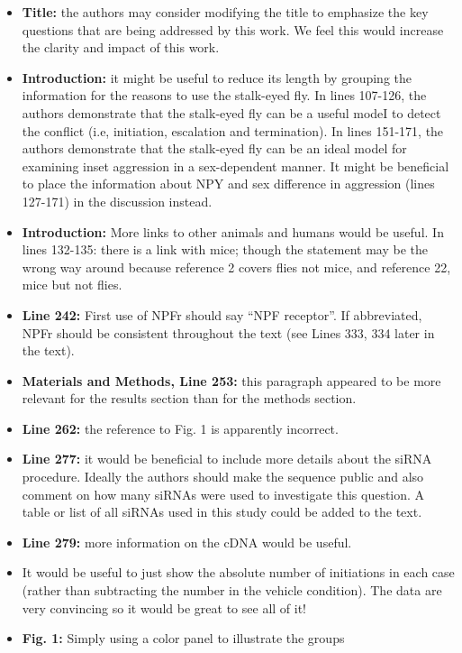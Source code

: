 \documentclass[10pt]{article}
\providecommand{\tightlist}{\setlength{\itemsep}{0pt}\setlength{\parskip}{0pt}}%
\begin{document}
\begin{itemize}
\tightlist
\item
  \textbf{Title:} the authors may consider modifying the title to
  emphasize the key questions that are being addressed by this work. We
  feel this would increase the clarity and impact of this work.
\item
  \textbf{Introduction:} it might be useful to reduce its length by
  grouping the information for the reasons to use the stalk-eyed fly. In
  lines 107-126, the authors demonstrate that the stalk-eyed fly can be
  a useful modeI to detect the conflict (i.e, initiation, escalation and
  termination). In lines 151-171, the authors demonstrate that the
  stalk-eyed fly can be an ideal model for examining inset aggression in
  a sex-dependent manner. It might be beneficial to place the
  information about NPY and sex difference in aggression (lines 127-171)
  in the discussion instead.~
\item
  \textbf{Introduction:} More links to other animals and humans would be
  useful. In lines 132-135: there is a link with mice; though the
  statement may be the wrong way around because reference 2 covers flies
  not mice, and reference 22, mice but not flies.
\item
  \textbf{Line 242:} First use of NPFr should say ``NPF receptor''. If
  abbreviated, NPFr should be consistent throughout the text (see Lines
  333, 334 later in the text).
\item
  \textbf{Materials and Methods, Line 253:} this paragraph appeared to
  be more relevant for the results section than for the methods
  section.~
\item
  \textbf{Line 262:} the reference to Fig. 1 is apparently incorrect.
\item
  \textbf{Line 277:} it would be beneficial to include more details
  about the siRNA procedure. Ideally the authors should make the
  sequence public and also comment on how many siRNAs were used to
  investigate this question. A table or list of all siRNAs used in this
  study could be added to the text.
\item
  \textbf{Line 279:} more information on the cDNA would be useful.
\item
  It would be useful to just show the absolute number of initiations in
  each case (rather than subtracting the number in the vehicle
  condition). The data are very convincing so it would be great to see
  all of it!
\item
  \textbf{Fig. 1:} Simply using a color panel to illustrate the groups

\end{itemize}
\end{document}
